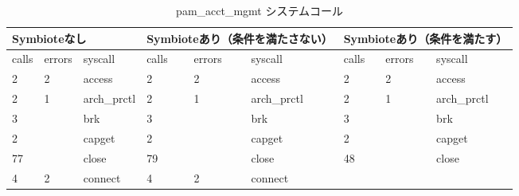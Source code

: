 \documentclass[submit,techreq,noauthor]{eco}	%
\begin{document}
\begin{table*}[t]
  \centering
  \caption{pam\_acct\_mgmt システムコール}
  \label{table: pam}
  \begin{tabular}{|lllllllll|}
  \hline
  \multicolumn{3}{|l|}{Symbioteなし}                                                                   & \multicolumn{3}{l|}{Symbioteあり（条件を満たさない）}                                                         & \multicolumn{3}{l|}{Symbioteあり（条件を満たす）}                                      \\ \hline
  \multicolumn{1}{|l|}{calls} & \multicolumn{1}{l|}{errors} & \multicolumn{1}{l|}{syscall}           & \multicolumn{1}{l|}{calls} & \multicolumn{1}{l|}{errors} & \multicolumn{1}{l|}{syscall}           & \multicolumn{1}{l|}{calls} & \multicolumn{1}{l|}{errors} & syscall           \\ \hline
  \multicolumn{1}{|l|}{2}     & \multicolumn{1}{l|}{2}      & \multicolumn{1}{l|}{access}            & \multicolumn{1}{l|}{2}     & \multicolumn{1}{l|}{2}      & \multicolumn{1}{l|}{access}            & \multicolumn{1}{l|}{2}     & \multicolumn{1}{l|}{2}      & access            \\
  \multicolumn{1}{|l|}{2}     & \multicolumn{1}{l|}{1}      & \multicolumn{1}{l|}{arch\_prctl}       & \multicolumn{1}{l|}{2}     & \multicolumn{1}{l|}{1}      & \multicolumn{1}{l|}{arch\_prctl}       & \multicolumn{1}{l|}{2}     & \multicolumn{1}{l|}{1}      & arch\_prctl       \\
  \multicolumn{1}{|l|}{3}     & \multicolumn{1}{l|}{}       & \multicolumn{1}{l|}{brk}               & \multicolumn{1}{l|}{3}     & \multicolumn{1}{l|}{}       & \multicolumn{1}{l|}{brk}               & \multicolumn{1}{l|}{3}     & \multicolumn{1}{l|}{}       & brk               \\
  \multicolumn{1}{|l|}{2}     & \multicolumn{1}{l|}{}       & \multicolumn{1}{l|}{capget}            & \multicolumn{1}{l|}{2}     & \multicolumn{1}{l|}{}       & \multicolumn{1}{l|}{capget}            & \multicolumn{1}{l|}{2}     & \multicolumn{1}{l|}{}       & capget            \\
  \multicolumn{1}{|l|}{77}    & \multicolumn{1}{l|}{}       & \multicolumn{1}{l|}{close}             & \multicolumn{1}{l|}{79}    & \multicolumn{1}{l|}{}       & \multicolumn{1}{l|}{close}             & \multicolumn{1}{l|}{48}    & \multicolumn{1}{l|}{}       & close             \\
  \multicolumn{1}{|l|}{4}     & \multicolumn{1}{l|}{2}      & \multicolumn{1}{l|}{connect}           & \multicolumn{1}{l|}{4}     & \multicolumn{1}{l|}{2}      & \multicolumn{1}{l|}{connect}           & \multicolumn{1}{l|}{}      & \multicolumn{1}{l|}{}       &                   \\

\end{tabular}
\end{table*}
\end{document}

